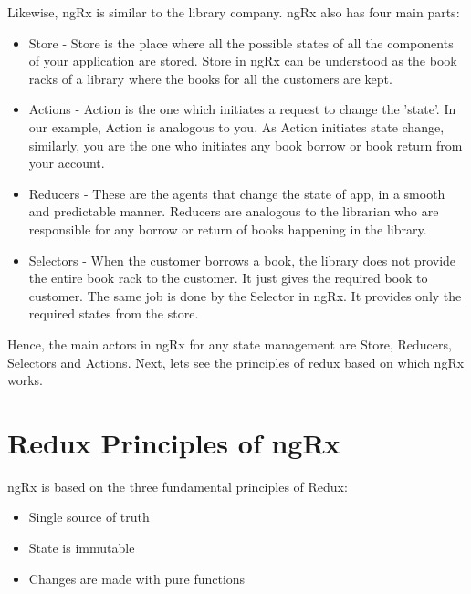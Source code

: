 \documentclass{report}
\begin{document}
Likewise, ngRx is similar to the library company. ngRx also has four main parts:
\begin{itemize}
	\item{Store - Store is the place where all the possible states of all the components of your application are stored. Store in ngRx can be understood as the book racks of a library where the books for all the customers are kept.}
	\item{Actions - Action is the one which initiates a request to change the 'state'. In our example, Action is analogous to you. As Action initiates state change, similarly, you are the one who initiates any book borrow or book return from your account.}
	\item{Reducers - These are the agents that change the state of app, in a smooth and predictable manner. Reducers are analogous to the librarian who are responsible for any borrow or return of books happening in the library.}
	\item{Selectors - When the customer borrows a book, the library does not provide the entire book rack to the customer. It just gives the required book to customer. The same job is done by the Selector in ngRx. It provides only the required states from the store.}
\end{itemize}

Hence, the main actors in ngRx for any state management are Store, Reducers, Selectors and Actions.
Next, lets see the principles of redux based on which ngRx works.
\section{Redux Principles of ngRx}
ngRx is based on the three fundamental principles of Redux:

\begin{itemize}
	\item{Single source of truth}
	\item{State is immutable}
	\item{Changes are made with pure functions}
\end{itemize}
\end{document}
